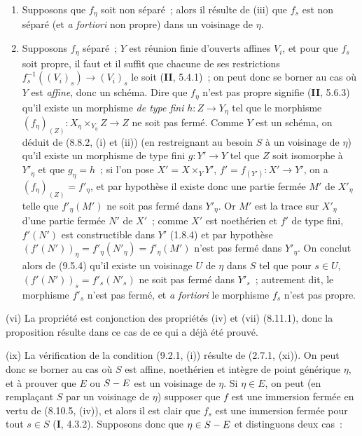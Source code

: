 \begin{enumerate}[label=\upshape{$\arabic{enumi}^\circ$}]
  \item Supposons que $f_\eta$ soit non séparé~; alors il résulte de (iii) que
  $f_s$ est non séparé (et \emph{a fortiori} non propre) dans un voisinage de
  $\eta$.

  \item Supposons $f_\eta$ séparé~; $Y$ est réunion finie d'ouverts affines
  $V_i$, et pour que $f_s$ soit propre, il faut et il suffit que chacune de ses
  restrictions $f_s^{-1}((V_i)_s)\to(V_i)_s$ le soit (\textbf{II}, 5.4.1)~;
  on peut donc se borner au cas où $Y$ est \emph{affine}, donc un schéma. Dire
  que $f_\eta$ n'est pas propre signifie (\textbf{II}, 5.6.3) qu'il existe un
  morphisme \emph{de type fini} $h:Z\to Y_\eta$ tel que le morphisme
  $(f_\eta)_{(Z)}:X_\eta\times_{Y_\eta}Z\to Z$ ne soit pas fermé. Comme $Y$ est
  un schéma, on déduit de (8.8.2, (i) et (ii)) (en restreignant au besoin $S$ à
  un voisinage de $\eta$) qu'il existe un morphisme de type fini $g:Y'\to Y$
  tel que $Z$ soit isomorphe à $Y'_\eta$ et que $g_\eta=h$~; si l'on pose
  $X'=X\times_YY'$, $f'=f_{(Y')}:X'\to Y'$, on a
  $(f_\eta)_{(Z)}=f'_\eta$, et par hypothèse il existe donc une partie fermée
  $M'$ de $X'_\eta$ telle que $f'_\eta(M')$ ne soit pas fermé dans $Y'_\eta$.
  Or $M'$ est la trace sur $X'_\eta$ d'une partie fermée $N'$ de $X'$~; comme
  $X'$ est noethérien et $f'$ de type fini, $f'(N')$ est constructible dans
  $Y'$ (1.8.4) et par hypothèse
  $(f'(N'))_\eta=f'_\eta(N'_\eta)=f'_\eta(M')$ n'est pas fermé dans
  $Y'_\eta$. On conclut alors de (9.5.4) qu'il existe un voisinage $U$ de
  $\eta$ dans $S$ tel que pour $s\in U$,
  $(f'(N'))_s=f'_s(N'_s)$ ne soit pas fermé dans $Y'_s$~; autrement dit, le
  morphisme $f'_s$ n'est pas fermé, et \emph{a fortiori} le morphisme $f_s$
  n'est pas propre.
\end{enumerate}

(vi) La propriété est conjonction des propriétés (iv) et (vii) (8.11.1), donc
la proposition résulte dans ce cas de ce qui a déjà été prouvé.

(ix) La vérification de la condition (9.2.1, (i)) résulte de (2.7.1, (xi)). On
peut donc se borner au cas où $S$ est affine, noethérien et intègre de point
générique $\eta$, et à prouver que $E$ ou $S- E$ est un voisinage de $\eta$. Si
$\eta\in E$, on peut (en remplaçant $S$ par un voisinage de $\eta$) supposer
que $f$ est une immersion fermée en vertu de (8.10.5, (iv)), et alors il est
clair que $f_s$ est une immersion fermée pour tout $s\in S$ (\textbf{I},
4.3.2). Supposons donc que $\eta\in S- E$ et distinguons deux cas~:

